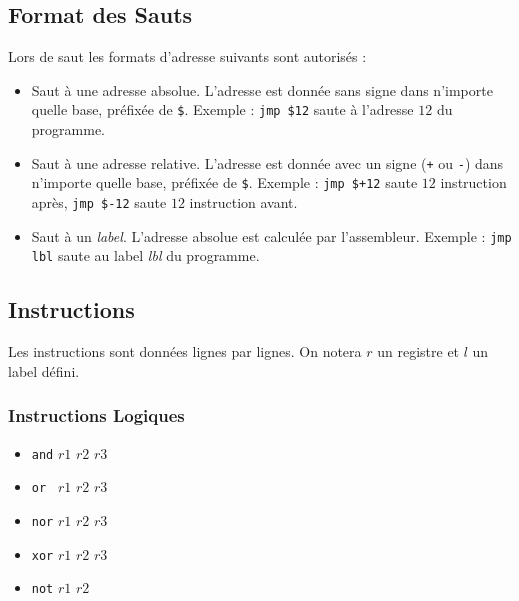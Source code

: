 \documentclass[french, 12pt]{article}
\begin{document}
\subsection*{Format des Sauts}

Lors de saut les formats d'adresse suivants sont autorisés :
\begin{itemize}
      \item Saut à une adresse absolue. L'adresse est donnée sans signe dans
            n'importe quelle base, préfixée de \verb|$|. Exemple :
            \verb|jmp $12| saute à l'adresse $12$ du programme.
      \item Saut à une adresse relative. L'adresse est donnée avec un signe
            (\texttt{+} ou \texttt{-}) dans n'importe quelle base, préfixée de
            \verb|$|. Exemple : \verb|jmp $+12| saute $12$ instruction après,
            \verb|jmp $-12| saute $12$ instruction avant.
      \item Saut à un \emph{label}. L'adresse absolue est calculée par
            l'assembleur. Exemple : \verb|jmp lbl| saute au label \emph{lbl} du
            programme.
\end{itemize}


\subsection*{Instructions}

Les instructions sont données lignes par lignes. On notera $r$ un registre et
$l$ un label défini.

\subsubsection*{Instructions Logiques}

\begin{itemize}
      \item \verb|and| $r1$ $r2$ $r3$
      \item \verb|or | $r1$ $r2$ $r3$
      \item \verb|nor| $r1$ $r2$ $r3$
      \item \verb|xor| $r1$ $r2$ $r3$
      \item \verb|not| $r1$ $r2$
\end{itemize}
\end{document}
